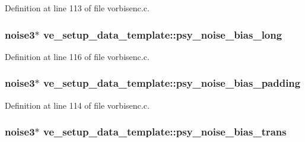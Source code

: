 Definition at line 113 of file vorbisenc.\+c.

\subsubsection[{\texorpdfstring{psy\+\_\+noise\+\_\+bias\+\_\+long}{psy_noise_bias_long}}]{ {\bf noise3}$\ast$ ve\+\_\+setup\+\_\+data\+\_\+template\+::psy\+\_\+noise\+\_\+bias\+\_\+long}\hypertarget{structve__setup__data__template_ad3afba81dd6940895281778e8506e4e8}{}\label{structve__setup__data__template_ad3afba81dd6940895281778e8506e4e8}


Definition at line 116 of file vorbisenc.\+c.

\subsubsection[{\texorpdfstring{psy\+\_\+noise\+\_\+bias\+\_\+padding}{psy_noise_bias_padding}}]{ {\bf noise3}$\ast$ ve\+\_\+setup\+\_\+data\+\_\+template\+::psy\+\_\+noise\+\_\+bias\+\_\+padding}\hypertarget{structve__setup__data__template_ad8f7e298cbc5991d0a477d62cc739596}{}\label{structve__setup__data__template_ad8f7e298cbc5991d0a477d62cc739596}


Definition at line 114 of file vorbisenc.\+c.

\subsubsection[{\texorpdfstring{psy\+\_\+noise\+\_\+bias\+\_\+trans}{psy_noise_bias_trans}}]{ {\bf noise3}$\ast$ ve\+\_\+setup\+\_\+data\+\_\+template\+::psy\+\_\+noise\+\_\+bias\+\_\+trans}\hypertarget{structve__setup__data__template_a947c600433aa972329cb6df1e545f0ee}{}\label{structve__setup__data__template_a947c600433aa972329cb6df1e545f0ee}


